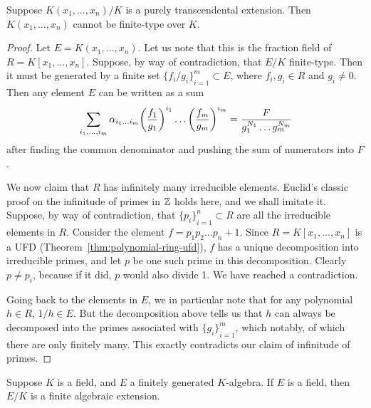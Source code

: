 \begin{proposition}\label{prop:finite-type-algebraic}
    Suppose \(K(x_1,\hdots,x_n)/K\) is a purely transcendental extension.
    Then \(K(x_1,\hdots,x_n)\) cannot be finite-type over \(K\).
\end{proposition}
\begin{proof}
    Let \(E = K(x_1,\hdots,x_n)\).
    Let us note that this is the fraction field of \(R = K[x_1,\hdots,x_n]\).
    Suppose, by way of contradiction, that \(E/K\) finite-type.
    Then it must be generated by a finite set \({\{f_i/g_i\}}_{i=1}^m \subset E\),
    where \(f_i,g_i \in R\) and \(g_i \neq 0\).
    Then any element \(E\) can be written as a sum
    \begin{equation*}
        \sum_{i_1,\hdots,i_m} \alpha_{i_1 \hdots i_m}
        \pqty{\frac{f_1}{g_1}}^{i_1}\hdots\pqty{\frac{f_m}{g_m}}^{i_m}
        = \frac{F}{g_1^{N_1} \hdots g_m^{N_m}}
    \end{equation*}
    after finding the common denominator and pushing the sum of numerators into \(F\).

    We now claim that \(R\) has infinitely many irreducible elements.
    Euclid's classic proof on the infinitude of primes in \(\mathbb{Z}\) holds here,
    and we shall imitate it.
    Suppose, by way of contradiction,
    that \({\{p_i\}}_{i=1}^n \subset R\) are all the irreducible elements in \(R\).
    Consider the element \(f = p_1 p_2 \hdots p_n + 1\).
    Since \(R = K[x_1,\hdots,x_n]\) is a UFD (Theorem~\ref{thm:polynomial-ring-ufd}),
    \(f\) has a unique decomposition into irreducible primes,
    and let \(p\) be one such prime in this decomposition.
    Clearly \(p \neq p_i\), because if it did, \(p\) would also divide 1.
    We have reached a contradiction.

    Going back to the elements in \(E\),
    we in particular note that for any polynomial \(h \in R\), \(1/h \in E\).
    But the decomposition above tells us that \(h\) can always be decomposed
    into the primes associated with \({\{g_i\}}_{i=1}^m\),
    which notably, of which there are only finitely many.
    This exactly contradicts our claim of infinitude of primes.
\end{proof}
\begin{theorem}\label{thm:finite-type-algebraic}
    Suppose \(K\) is a field, and \(E\) a finitely generated \(K\)-algebra.
    If \(E\) is a field, then \(E/K\) is a finite algebraic extension.
\end{theorem}
